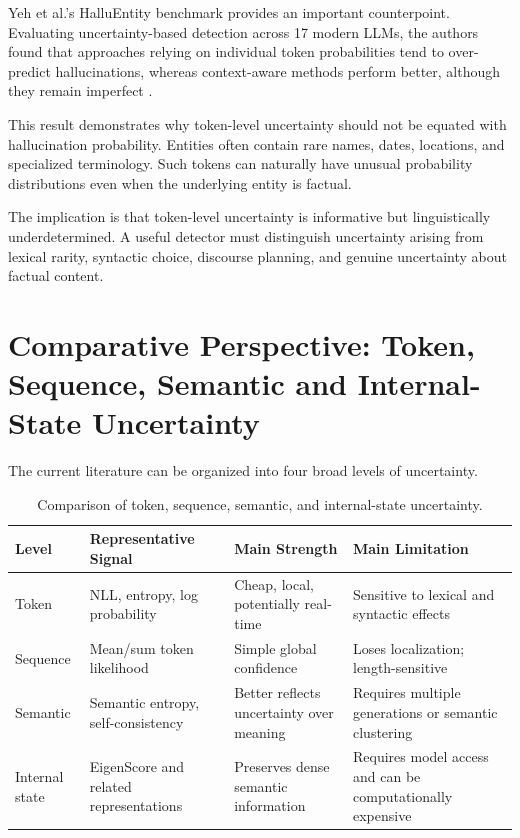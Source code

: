 \documentclass[11pt]{article}
\begin{document}
Yeh et al.'s HalluEntity benchmark provides an important counterpoint. Evaluating uncertainty-based detection across 17 modern LLMs, the authors found that approaches relying on individual token probabilities tend to over-predict hallucinations, whereas context-aware methods perform better, although they remain imperfect \cite{yeh2025}.

This result demonstrates why token-level uncertainty should not be equated with hallucination probability. Entities often contain rare names, dates, locations, and specialized terminology. Such tokens can naturally have unusual probability distributions even when the underlying entity is factual.

The implication is that token-level uncertainty is informative but linguistically underdetermined. A useful detector must distinguish uncertainty arising from lexical rarity, syntactic choice, discourse planning, and genuine uncertainty about factual content.

\section{Comparative Perspective: Token, Sequence, Semantic and Internal-State Uncertainty}
\label{sec:comparative}

The current literature can be organized into four broad levels of uncertainty.

\begin{table}[htbp]
\centering
\caption{Comparison of token, sequence, semantic, and internal-state uncertainty.}
\label{tab:uncertainty}
\begin{tabular}{p{} p{} p{} p{}}
\toprule
\textbf{Level} &
\textbf{Representative Signal} &
\textbf{Main Strength} &
\textbf{Main Limitation} \\
\midrule
Token &
NLL, entropy, log probability &
Cheap, local, potentially real-time &
Sensitive to lexical and syntactic effects \\

Sequence &
Mean/sum token likelihood &
Simple global confidence &
Loses localization; length-sensitive \\

Semantic &
Semantic entropy, self-consistency &
Better reflects uncertainty over meaning &
Requires multiple generations or semantic clustering \\

Internal state &
EigenScore and related representations &
Preserves dense semantic information &
Requires model access and can be computationally expensive \\
\bottomrule
\end{tabular}
\end{table}
\end{document}
